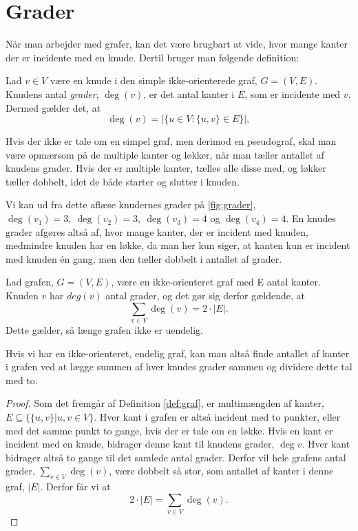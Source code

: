 \section{Grader} \label{sec:grader}
Når man arbejder med grafer, kan det være brugbart at vide, hvor mange kanter der er incidente med en knude. Dertil bruger man følgende definition:

\begin{defn}[Grader] \label{defn:grader}
Lad $v \in V$ være en knude i den simple ikke-orienterede graf, $G = (V,E)$. Knudens antal \emph{grader}, $\deg(v)$, er det antal kanter i $E$, som er incidente med $v$. Dermed gælder det, at
\begin{equation}
\deg(v)=|\{u \in V: \{u,v\} \in E \}|,
\end{equation}
\end{defn}

Hvis der ikke er tale om en simpel graf, men derimod en pseudograf, skal man være opmærsom på de multiple kanter og løkker, når man tæller antallet af knudens grader. Hvis der er multiple kanter, tælles alle disse med, og løkker tæller dobbelt, idet de både starter og slutter i knuden.

\begin{exmp} \label{ex:grader}

Vi kan ud fra dette aflæse knudernes grader på \autoref{fig:grader}, $\deg(v_{1})=3, \ \deg(v_{2})=3, \ \deg(v_{3})=4$ og $\deg(v_{4})=4$. En knudes grader afgøres altså af, hvor mange kanter, der er incident med knuden, medmindre knuden har en løkke, da man her kun siger, at kanten kun er incident med knuden én gang, men den tæller dobbelt i antallet af grader.


\end{exmp}

\begin{thm}
Lad grafen, $G = (V,E)$, være en ikke-orienteret graf med E antal kanter. Knuden $v$ har $deg(v)$ antal grader, og det gør sig derfor gældende, at
\begin{equation}
	\sum_{v \in V} { } \deg(v) = 2 \cdot |E|.
\end{equation}
Dette gælder, så længe grafen ikke er uendelig.
\end{thm}
Hvis vi har en ikke-orienteret, endelig graf, kan man altså finde antallet af kanter i grafen ved at lægge summen af hver knudes grader sammen og dividere dette tal med to.

\begin{proof}
Som det fremgår af Definition \ref{def:graf}, er multimængden af kanter, $E \subseteq \{\{u,v\}|u,v \in V \}$. Hver kant i grafen er altså incident med to punkter, eller med det samme punkt to gange, hvis der er tale om en løkke. Hvis en kant er incident med en knude, bidrager denne kant til knudens grader, $\deg{v}$. Hver kant bidrager altså to gange til det samlede antal grader. Derfor vil hele grafens antal grader, $\sum_{v \in V} { } \deg(v)$, være dobbelt så stor, som antallet af kanter i denne graf, $|E|$. Derfor får vi at 
\begin{equation}
2 \cdot |E|= \sum_{v \in V} { } \deg(v).
\end{equation} 
\end{proof}

